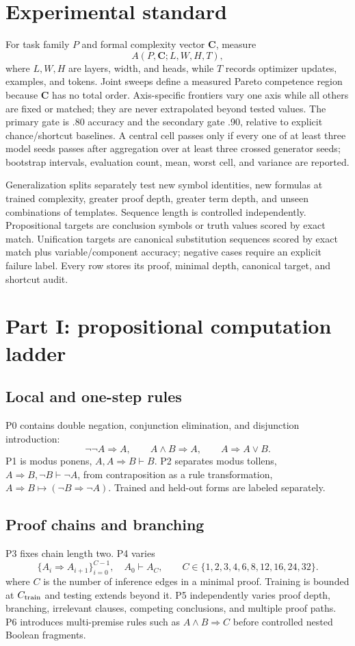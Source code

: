 \documentclass[10pt]{article}
\begin{document}
\section{Experimental standard}
For task family $P$ and formal complexity vector $\mathbf C$, measure
\[
A(P,\mathbf C;L,W,H,T),
\]
where $L,W,H$ are layers, width, and heads, while $T$ records optimizer updates, examples, and tokens. Joint sweeps define a measured Pareto competence region because $\mathbf C$ has no total order. Axis-specific frontiers vary one axis while all others are fixed or matched; they are never extrapolated beyond tested values. The primary gate is .80 accuracy and the secondary gate .90, relative to explicit chance/shortcut baselines. A central cell passes only if every one of at least three model seeds passes after aggregation over at least three crossed generator seeds; bootstrap intervals, evaluation count, mean, worst cell, and variance are reported.

Generalization splits separately test new symbol identities, new formulas at trained complexity, greater proof depth, greater term depth, and unseen combinations of templates. Sequence length is controlled independently. Propositional targets are conclusion symbols or truth values scored by exact match. Unification targets are canonical substitution sequences scored by exact match plus variable/component accuracy; negative cases require an explicit failure label. Every row stores its proof, minimal depth, canonical target, and shortcut audit.

\section{Part I: propositional computation ladder}
\subsection{Local and one-step rules}
P0 contains double negation, conjunction elimination, and disjunction introduction:
\[
\neg\neg A\Rightarrow A,\qquad A\land B\Rightarrow A,\qquad A\Rightarrow A\lor B.
\]
P1 is modus ponens, $A,A\Rightarrow B\vdash B$. P2 separates modus tollens, $A\Rightarrow B,\neg B\vdash\neg A$, from contraposition as a rule transformation, $A\Rightarrow B\mapsto(\neg B\Rightarrow\neg A)$. Trained and held-out forms are labeled separately.

\subsection{Proof chains and branching}
P3 fixes chain length two. P4 varies
\[
\{A_i\Rightarrow A_{i+1}\}_{i=0}^{C-1},\quad A_0\vdash A_C,
\qquad C\in\{1,2,3,4,6,8,12,16,24,32\}.
\]
where $C$ is the number of inference edges in a minimal proof. Training is bounded at $C_{\rm train}$ and testing extends beyond it. P5 independently varies proof depth, branching, irrelevant clauses, competing conclusions, and multiple proof paths. P6 introduces multi-premise rules such as $A\land B\Rightarrow C$ before controlled nested Boolean fragments.
\end{document}
